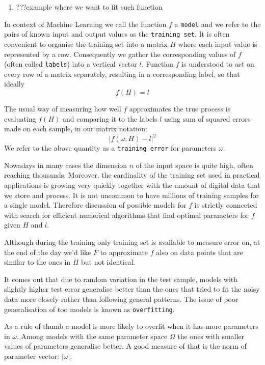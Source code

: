 \documentclass[a4paper]{article}
\theoremstyle{break}
\newcommand{\bib}{???}
\begin{document}
\begin{enumerate}
    \item \bib example where we want to fit such function
\end{enumerate}

In context of Machine Learning we call the function $f$ a {\tt model} and we refer to the pairs of known input and output values as the {\tt training set}. It is often convenient to organise the training set into a matrix $H$ where each input value is represented by a row. Consequently we gather the corresponding values of $f$ (often called {\tt labels}) into a vertical vector $l$. Function $f$ is understood to act on every row of a matrix separately, resulting in a corresponding label, so that ideally
    $$ f(H) = l $$

The usual way of measuring how well $f$ approximates the true process is evaluating $f(H)$ and comparing it to the labels $l$ using sum of squared errors made on each sample, in our matrix notation:
$$ | f(\omega; H) - l |^2 $$
We refer to the above quantity as a {\tt training error} for parameters $\omega$.

Nowadays in many cases the dimension $n$ of the input space is quite high, often reaching thousands. Moreover, the cardinality of the training set used in practical applications is growing very quickly together with the amount of digital data that we store and process. It is not uncommon to have millions of training samples for a single model. Therefore discussion of possible models for $f$ is strictly connected with search for efficient numerical algorithms that find optimal parameters for $f$ given $H$ and $l$.

Although during the training only training set is available to measure error on, at the end of the day we'd like $F$ to approximate $f$ also on data points that are similar to the ones in $H$ but not identical.

It comes out that due to random variation in the test sample,  models with slightly higher test error generalise better than the ones that tried to fit the noisy data more closely rather than following general patterns.
The issue of poor generalisation of too  models is known as {\tt overfitting}.

As a rule of thumb a model is more likely to overfit when it has more parameters in $ \omega $. Among models with the same parameter space $ \Omega $ the ones with smaller values of parameters generalise better. A good measure of that is the norm of parameter vector: $ | \omega | $.
\end{document}
